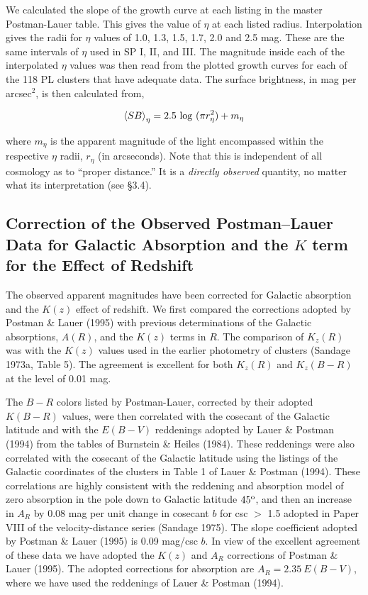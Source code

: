 \documentclass[preprint]{aastex}
\begin{document}
We calculated the slope of the growth curve at each listing in the
master Postman-Lauer table. This gives the value of $\eta$ at each
listed radius. Interpolation gives the radii for $\eta$ values of 1.0,
1.3, 1.5, 1.7, 2.0 and 2.5 mag. These are the same intervals of $\eta$
used in SP I, II, and III.  The magnitude inside each of the
interpolated $\eta$ values was then read from the plotted growth
curves for each of the 118 PL clusters that have adequate data. The
surface brightness, in mag per arcsec$^2$, is then calculated from,

\begin{equation}
    {\langle SB \rangle}_{\eta} = 2.5~{\rm log}~(\pi r_{\eta}^{2}) + m_{\eta}
\end{equation}

\noindent where $m_{\eta}$ is the apparent magnitude of the light
encompassed within the respective $\eta$ radii, $r_\eta$ (in
arcseconds). Note that this is independent of all cosmology as to
``proper distance.'' It is a {\it directly observed} quantity, no
matter what its interpretation (see \S 3.4).

\subsection{Correction of the Observed Postman--Lauer Data for Galactic Absorption and the $K$ term for the Effect of Redshift} 

The observed apparent magnitudes have been corrected for Galactic
absorption and the $K(z)$ effect of redshift. We first compared the
corrections adopted by Postman \& Lauer (1995) with previous
determinations of the Galactic absorptions, $A(R)$, and the $K(z)$
terms in $R$. The comparison of $K_z (R)$ was with the $K(z)$ values
used in the earlier photometry of clusters (Sandage 1973a, Table
5). The agreement is excellent for both $K_z (R)$ and $K_z (B-R)$ at
the level of 0.01 mag.

The $B-R$ colors listed by Postman-Lauer, corrected by their adopted
$K(B-R)$ values, were then correlated with the cosecant of the
Galactic latitude and with the $E(B-V)$ reddenings adopted by Lauer \&
Postman (1994) from the tables of Burnstein \& Heiles (1984). These
reddenings were also correlated with the cosecant of the Galactic
latitude using the listings of the Galactic coordinates of the
clusters in Table 1 of Lauer \& Postman (1994). These correlations are
highly consistent with the reddening and absorption model of zero
absorption in the pole down to Galactic latitude $45^{\rm o}$, and
then an increase in $A_R$ by 0.08 mag per unit change in cosecant $b$
for csc $>$ 1.5 adopted in Paper VIII of the velocity-distance series
(Sandage 1975). The slope coefficient adopted by Postman \& Lauer
(1995) is 0.09 mag/csc $b$.  In view of the excellent agreement of
these data we have adopted the $K(z)$ and $A_R$ corrections of Postman
\& Lauer (1995).  The adopted corrections for absorption are $A_R =
2.35~E(B-V)$, where we have used the reddenings of Lauer \& Postman
(1994).
\end{document}
